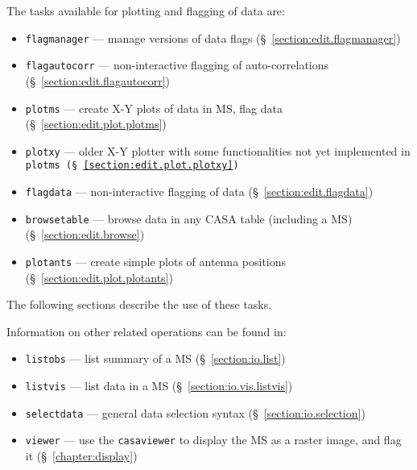 The tasks available for plotting and flagging of data are:
\begin{itemize}
   \item {\tt flagmanager} --- manage versions of data flags
      (\S~\ref{section:edit.flagmanager})
   \item {\tt flagautocorr} --- non-interactive flagging of auto-correlations
      (\S~\ref{section:edit.flagautocorr})
   \item {\tt plotms} --- create X-Y plots of data in MS, flag data
      (\S~\ref{section:edit.plot.plotms})
   \item {\tt plotxy} --- older X-Y plotter with some functionalities not yet implemented in \tt{plotms}
      (\S~\ref{section:edit.plot.plotxy})
   \item {\tt flagdata} --- non-interactive flagging of data
      (\S~\ref{section:edit.flagdata})
   \item {\tt browsetable} --- browse data in any CASA table (including a MS)
      (\S~\ref{section:edit.browse})
   \item {\tt plotants} --- create simple plots of antenna positions
      (\S~\ref{section:edit.plot.plotants})
\end{itemize}

The following sections describe the use of these tasks.

Information on other related operations can be found in:
\begin{itemize}
   \item {\tt listobs} --- list summary of a MS (\S~\ref{section:io.list})
   \item {\tt listvis} --- list data in a MS (\S~\ref{section:io.vis.listvis})
   \item {\tt selectdata} --- general data selection syntax
      (\S~\ref{section:io.selection})
   \item {\tt viewer} --- use the {\tt casaviewer} to display the MS as a 
      raster image, and flag it (\S~\ref{chapter:display})

\end{itemize}

